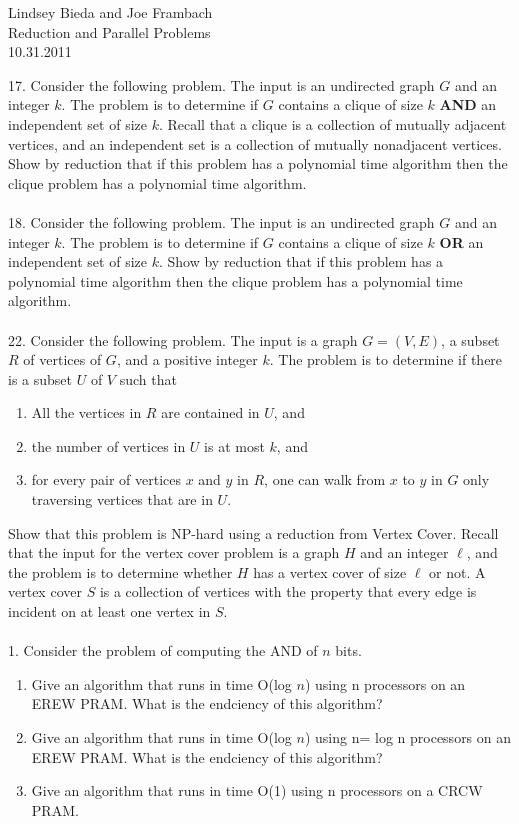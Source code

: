 \documentclass[10pt]{article}
\begin{document}
	\begin{flushright}
	Lindsey Bieda and Joe Frambach\\
	Reduction and Parallel Problems\\
	10.31.2011
	\end{flushright}
	17. Consider the following problem. The input is an undirected graph $G$ and an integer $k$. The problem
	is to determine if $G$ contains a clique of size $k$ \textbf{AND} an independent set of size $k$. Recall that a
	clique is a collection of mutually adjacent vertices, and an independent set is a collection of mutually
	nonadjacent vertices. Show by reduction that if this problem has a polynomial time algorithm then
	the clique problem has a polynomial time algorithm.
	\\
	\\
	18. Consider the following problem. The input is an undirected graph $G$ and an integer $k$. The problem
	is to determine if $G$ contains a clique of size $k$ \textbf{OR} an independent set of size $k$. Show by reduction
	that if this problem has a polynomial time algorithm then the clique problem has a polynomial time
	algorithm.
	\\
	\\
	22. Consider the following problem. The input is a graph $G = (V, E)$, a subset $R$ of vertices of $G$, and a
	positive integer $k$. The problem is to determine if there is a subset $U$ of $V$ such that
	\begin{enumerate}
		\item All the vertices in $R$ are contained in $U$, and
		\item the number of vertices in $U$ is at most $k$, and
		\item for every pair of vertices $x$ and $y$ in $R$, one can walk from $x$ to $y$ in $G$ only traversing vertices that
		are in $U$.
	\end{enumerate}
	Show that this problem is NP-hard using a reduction from Vertex Cover. Recall that the input for the
	vertex cover problem is a graph $H$ and an integer $\ell$, and the problem is to determine whether $H$ has a
	vertex cover of size $\ell$ or not. A vertex cover $S$ is a collection of vertices with the property that every
	edge is incident on at least one vertex in $S$.
		\\
	\\
	1. Consider the problem of computing the AND of $n$ bits.
	\begin{enumerate}
		\item Give an algorithm that runs in time O(log $n$) using n processors on an EREW PRAM. What is
		the endciency of this algorithm?
		\item Give an algorithm that runs in time O(log $n$) using n= log n processors on an EREW PRAM.
		What is the endciency of this algorithm?
		\item Give an algorithm that runs in time O(1) using n processors on a CRCW PRAM.
	\end{enumerate}
\end{document}
